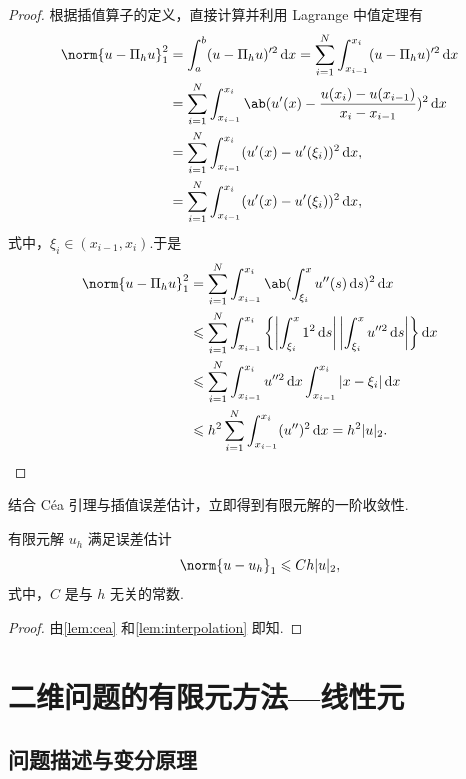 \begin{proof}
根据插值算子的定义，直接计算并利用 Lagrange 中值定理有
\begin{align*}
\norm{u - \Pi_h u}_1^2 &= \int_a^b (u - \Pi_h u)'^2 \d x = \sum_{i=1}^N \int_{x_{i-1}}^{x_i} (u -
 \Pi_h u)'^2 \d x \\
&= \sum_{i=1}^N \int_{x_{i-1}}^{x_i} \ab(u'(x) - \frac{u(x_i) - u(x_{i-1})}{x_i - x_{i-1}})^2 \d
x \\
&= \sum_{i=1}^N \int_{x_{i-1}}^{x_i} (u'(x) - u'(\xi_i))^2 \d x, \\
&= \sum_{i=1}^N \int_{x_{i-1}}^{x_i} (u'(x) - u'(\xi_i))^2 \d x,
\end{align*}
式中，$\xi_i \in (x_{i-1}, x_i)$.于是
\begin{align*}
\norm{u - \Pi_h u}_1^2 &= \sum_{i=1}^N \int_{x_{i-1}}^{x_i} \ab(\int_{\xi_i}^x u''(s)\d s)^2 \d x
 \\
&\leq \sum_{i=1}^N \int_{x_{i-1}}^{x_i} \left\{\left|\int_{\xi_i}^x 1^2 \d s\right|
\left|\int_{\xi_i}^x u''^2 \d s\right|\right\} \d x \\
&\leq \sum_{i=1}^N \int_{x_{i-1}}^{x_i} u''^2 \d x \int_{x_{i-1}}^{x_i} |x - \xi_i| \d x \\
&\leq h^2 \sum_{i=1}^N \int_{x_{i-1}}^{x_i} (u'')^2 \d x = h^2 |u|_2. \qedhere
\end{align*}
\end{proof}

结合 C\'ea 引理与插值误差估计，立即得到有限元解的一阶收敛性.

\begin{theorem}
有限元解 $u_h$ 满足误差估计
\begin{equation*}
\norm{u - u_h}_1 \leq C h |u|_2,
\end{equation*}
式中，$C$ 是与 $h$ 无关的常数.
\end{theorem}

\begin{proof}
由\cref{lem:cea} 和\cref{lem:interpolation} 即知.
\end{proof}

\section{二维问题的有限元方法---线性元}

\subsection{问题描述与变分原理}

